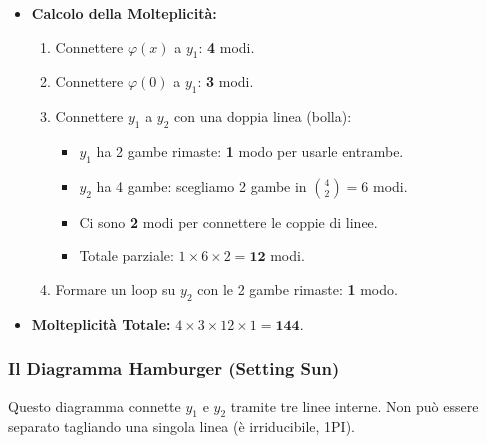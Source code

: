 \begin{itemize}
    \item \textbf{Calcolo della Molteplicità:}
    \begin{enumerate}
        \item Connettere $\varphi(x)$ a $y_1$: \textbf{4} modi.
        \item Connettere $\varphi(0)$ a $y_1$: \textbf{3} modi.
        \item Connettere $y_1$ a $y_2$ con una doppia linea (bolla):
            \begin{itemize}
                \item $y_1$ ha 2 gambe rimaste: \textbf{1} modo per usarle entrambe.
                \item $y_2$ ha 4 gambe: scegliamo 2 gambe in $\binom{4}{2} = 6$ modi.
                \item Ci sono \textbf{2} modi per connettere le coppie di linee.
                \item Totale parziale: $1 \times 6 \times 2 = \mathbf{12}$ modi.
            \end{itemize}
        \item Formare un loop su $y_2$ con le 2 gambe rimaste: \textbf{1} modo.
    \end{enumerate}
    
    \item \textbf{Molteplicità Totale:} $4 \times 3 \times 12 \times 1 = \mathbf{144}$.
\end{itemize}

\subsubsection{Il Diagramma Hamburger (Setting Sun)}

Questo diagramma connette $y_1$ e $y_2$ tramite tre linee interne. Non può essere separato tagliando una singola linea (è irriducibile, 1PI).

